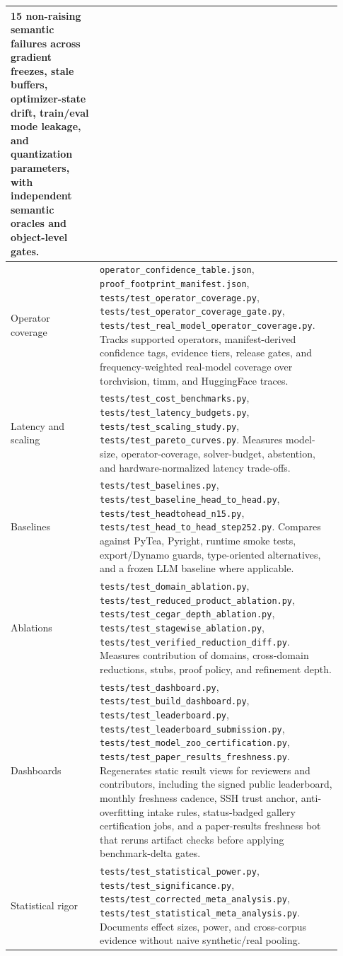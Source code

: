 \documentclass[11pt]{article}
\begin{document}
\begin{longtable}{|p{0.25\linewidth}|p{0.68\linewidth}|}
15 non-raising semantic failures across gradient freezes, stale buffers,
optimizer-state drift, train/eval mode leakage, and quantization parameters,
with independent semantic oracles and object-level gates. \\
\hline
Operator coverage &
\texttt{operator\_confidence\_table.json},
\texttt{proof\_footprint\_manifest.json},
\texttt{tests/test\_operator\_coverage.py},
\texttt{tests/test\_operator\_coverage\_gate.py},
\texttt{tests/test\_real\_model\_operator\_coverage.py}.  Tracks supported
operators, manifest-derived confidence tags, evidence tiers, release gates, and
frequency-weighted real-model coverage over torchvision, timm, and HuggingFace
traces. \\
\hline
Latency and scaling &
\texttt{tests/test\_cost\_benchmarks.py},
\texttt{tests/test\_latency\_budgets.py},
\texttt{tests/test\_scaling\_study.py},
\texttt{tests/test\_pareto\_curves.py}.  Measures model-size, operator-coverage,
solver-budget, abstention, and hardware-normalized latency trade-offs. \\
\hline
Baselines &
\texttt{tests/test\_baselines.py},
\texttt{tests/test\_baseline\_head\_to\_head.py},
\texttt{tests/test\_headtohead\_n15.py},
\texttt{tests/test\_head\_to\_head\_step252.py}.  Compares against PyTea,
Pyright, runtime smoke tests, export/Dynamo guards, type-oriented alternatives,
and a frozen LLM baseline where applicable. \\
\hline
Ablations &
\texttt{tests/test\_domain\_ablation.py},
\texttt{tests/test\_reduced\_product\_ablation.py},
\texttt{tests/test\_cegar\_depth\_ablation.py},
\texttt{tests/test\_stagewise\_ablation.py},
\texttt{tests/test\_verified\_reduction\_diff.py}.  Measures contribution of
domains, cross-domain reductions, stubs, proof policy, and refinement depth. \\
\hline
Dashboards &
\texttt{tests/test\_dashboard.py}, \texttt{tests/test\_build\_dashboard.py},
\texttt{tests/test\_leaderboard.py},
\texttt{tests/test\_leaderboard\_submission.py},
\texttt{tests/test\_model\_zoo\_certification.py},
\texttt{tests/test\_paper\_results\_freshness.py}.  Regenerates static result
views for reviewers and contributors, including the signed public leaderboard,
monthly freshness cadence, SSH trust anchor, anti-overfitting intake rules,
status-badged gallery certification jobs, and a paper-results freshness bot that
reruns artifact checks before applying benchmark-delta gates. \\
\hline
Statistical rigor &
\texttt{tests/test\_statistical\_power.py},
\texttt{tests/test\_significance.py},
\texttt{tests/test\_corrected\_meta\_analysis.py},
\texttt{tests/test\_statistical\_meta\_analysis.py}.  Documents effect sizes,
power, and cross-corpus evidence without naive synthetic/real pooling. \\
\hline
\end{longtable}
\end{document}
